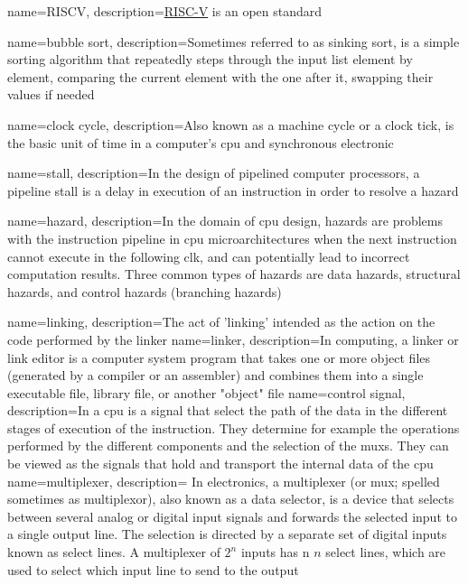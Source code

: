 {
    name=RISCV,
    description={\href{https://riscv.org/about/}{RISC-V} is an open standard \ISA}
}

{
    name=bubble sort,
    description={Sometimes referred to as sinking sort, is a simple sorting algorithm that repeatedly steps through the input list element by element, comparing the current element with the one after it, swapping their values if needed \cite{wiki:bubble}}
}

{
    name=clock cycle,
    description={Also known as a machine cycle or a clock tick, is the basic unit of time in a computer's \acrshort{cpu} and synchronous electronic}
}

{
    name=stall,
    description={In the design of pipelined computer processors, a pipeline stall is a delay in execution of an instruction in order to resolve a \gls{hazard} \cite{wiki:stall}}
}

{
    name=hazard,
    description={In the domain of \acrfull{cpu} design, hazards are problems with the instruction pipeline in \acrshort{cpu} microarchitectures when the next instruction cannot execute in the following \gls{clk}, and can potentially lead to incorrect computation results. Three common types of hazards are data hazards, structural hazards, and control hazards (branching hazards) \cite{wiki:haz}}
}

{
    name=linking,
    description={The act of 'linking' intended as the action on the code performed by the \gls{linker}}
}
{
    name=linker,
    description={In computing, a linker or link editor is a computer system program that takes one or more object files (generated by a compiler or an assembler) and combines them into a single executable file, library file, or another "object" file
    \cite{wiki:link}}
}
{
    name=control signal,
    description={In a \acrshort{cpu} is a signal that select the path of the data in the different stages of execution of the instruction. They determine for example the operations performed by the different components and the selection of the \acrshort{mux}s. They can be viewed as the signals that hold and transport the internal data of the \acrshort{cpu}
    }
}
{
    name=multiplexer,
    description={
    In electronics, a multiplexer (or mux; spelled sometimes as multiplexor), also known as a data selector, is a device that selects between several analog or digital input signals and forwards the selected input to a single output line. The selection is directed by a separate set of digital inputs known as select lines. A multiplexer of $ 2^{n}$ inputs has n $n$ select lines, which are used to select which input line to send to the output \cite{wiki:mux}
    }
}






